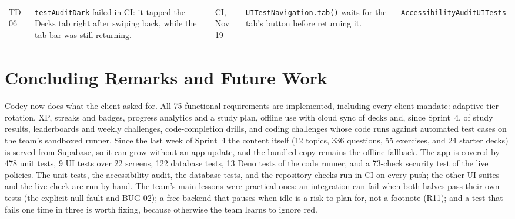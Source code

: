 \documentclass[12pt,letterpaper]{article}
\begin{document}
\begin{xltabular}{\textwidth}{@{}L{1.1cm} Y L{2.4cm} Y L{2.2cm}@{}}
TD-06 & \texttt{testAuditDark} failed in CI: it tapped the Decks tab right after swiping back, while the tab bar was still returning. & CI, Nov 19 & \texttt{UITestNavigation.tab()} waits for the tab's button before returning it. & \texttt{AccessibilityAuditUITests} \\
\end{xltabular}

\section{Concluding Remarks and Future Work}\label{sec:conclusion}
Codey now does what the client asked for. All 75 functional requirements are
implemented, including every client mandate: adaptive tier rotation, XP, streaks and
badges, progress analytics and a study plan, offline use with cloud sync of decks and,
since Sprint~4, of study results, leaderboards and weekly challenges, code-completion
drills, and coding challenges whose code runs against automated test cases on the
team's sandboxed runner. Since the last week of Sprint~4 the content itself
(12 topics, 336 questions, 55 exercises, and 24 starter decks) is served from Supabase,
so it can grow without an app update, and the bundled copy remains the offline
fallback. The app is covered by 478 unit tests, 9 UI tests over 22 screens, 122
database tests, 13 Deno tests of the code runner, and a 73-check security test of the live policies. The unit tests,
the accessibility audit, the database tests, and the repository checks run in CI on
every push; the other UI suites and the live check are run by hand. The team's main lessons were
practical ones: an integration can fail when both halves pass their own tests (the
explicit-null fault and BUG-02); a free backend that pauses when idle is a risk to
plan for, not a footnote (R11); and a test that fails one time in three is worth
fixing, because otherwise the team learns to ignore red.
\end{document}
